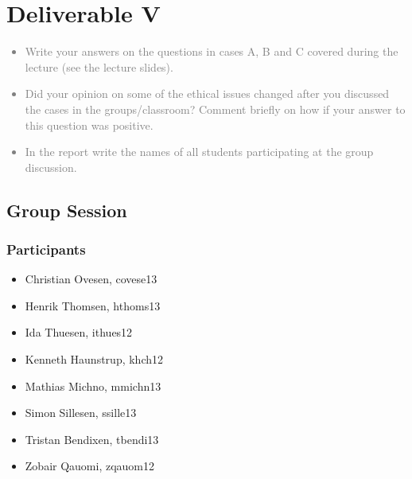 \chapter{Deliverable V}
\textcolor{gray}{%
\begin{itemize}
    \item Write your answers on the questions in cases A, B and C covered during the lecture (see the lecture slides).
    \item Did your opinion on some of the ethical issues changed after you discussed the cases in the groups/classroom? Comment briefly on how if your answer to this question was positive.
    \item In the report write the names of all students participating at the group discussion.
\end{itemize}}

\section{Group Session}
\subsection{Participants}
\begin{multicols}{2}
    \begin{itemize}
        \item Christian Ovesen, covese13
        \item Henrik Thomsen, hthoms13
        \item Ida Thuesen, ithues12
        \item Kenneth Haunstrup, khch12
        \item Mathias Michno, mmichn13
        \item Simon Sillesen, ssille13
        \item Tristan Bendixen, tbendi13
        \item Zobair Qauomi, zqauom12
    \end{itemize}
\end{multicols}

